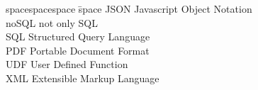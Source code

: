 
\begin{tabbing}
spacespacespace \= space \kill
JSON	 \> 	Javascript Object Notation \\
noSQL	 \> 	not only SQL \\
SQL	 	\> 		Structured Query Language \\
PDF	 	\> 		Portable Document Format \\
UDF	 	\> 		User Defined Function \\
XML	 	\>	 	Extensible Markup Language \\

\end{tabbing}
\endinput
